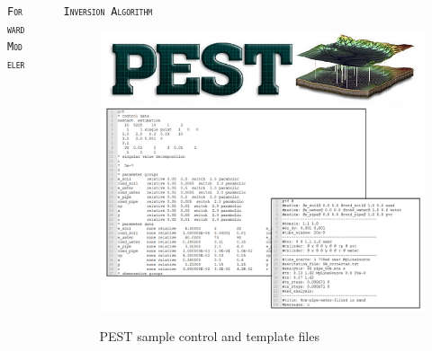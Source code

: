 \documentclass[final]{beamer}
\newlength{\sepwid}
\newlength{\onecolwid}
\newlength{\twocolwid}
\begin{document}
\begin{frame}[t]
\begin{columns}[t]
\begin{column}{\onecolwid}
\begin{block}{\textsc{\texttt{Forward Modeler}}}
\end{block}


\end{column} %

\begin{column}{\sepwid}\end{column} %

\begin{column}{\twocolwid} %

\begin{columns}[t,totalwidth=\twocolwid] %

\begin{column}{\onecolwid}\vspace{-.6in} %


\begin{block}{\textsc{\texttt{Inversion Algorithm}}}

\begin{figure}
	\includegraphics[width=0.8\linewidth]{PEST_flat.jpg}
	\vspace{1cm}
	\includegraphics[width=1.05\linewidth]{pest_image.png}
	\caption{PEST sample control and template files\cite{pest}}
\end{figure}


\end{block}
\end{column}
\end{columns}
\end{column}
\end{columns}
\end{frame}
\end{document}
